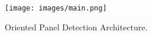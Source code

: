 \begin{figure}[ht!]
\centering
\texttt{[image: images/main.png]}
\caption{Oriented Panel Detection Architecture.}
\label{fig:architecture}
\end{figure}
